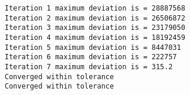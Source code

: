 \documentclass[
  letterpaper,
  DIV=11,
  numbers=noendperiod]{scrartcl}
\newenvironment{Shaded}{\begin{snugshade}}{\end{snugshade}}
\newcommand{\AttributeTok}[1]{\textcolor[rgb]{0.40,0.45,0.13}{#1}}
\newcommand{\ConstantTok}[1]{\textcolor[rgb]{0.56,0.35,0.01}{#1}}
\newcommand{\DecValTok}[1]{\textcolor[rgb]{0.68,0.00,0.00}{#1}}
\newcommand{\FunctionTok}[1]{\textcolor[rgb]{0.28,0.35,0.67}{#1}}
\newcommand{\NormalTok}[1]{\textcolor[rgb]{0.00,0.23,0.31}{#1}}
\newcommand{\OtherTok}[1]{\textcolor[rgb]{0.00,0.23,0.31}{#1}}
\newcommand{\SpecialCharTok}[1]{\textcolor[rgb]{0.37,0.37,0.37}{#1}}
\newcommand{\StringTok}[1]{\textcolor[rgb]{0.13,0.47,0.30}{#1}}
\begin{document}
\begin{Shaded}
\end{Shaded}

\begin{verbatim}
Iteration 1 maximum deviation is = 28887568 
Iteration 2 maximum deviation is = 26506872 
Iteration 3 maximum deviation is = 23179050 
Iteration 4 maximum deviation is = 18192459 
Iteration 5 maximum deviation is = 8447031 
Iteration 6 maximum deviation is = 222757 
Iteration 7 maximum deviation is = 315.2 
Converged within tolerance 
Converged within tolerance 
\end{verbatim}
\end{document}
